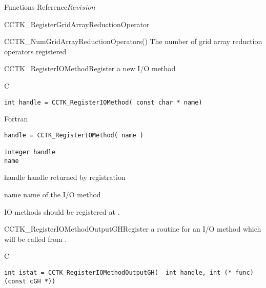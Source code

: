\begin{cactuspart}{ Functions Reference}{}{$Revision$}
\begin{FunctionDescription}{CCTK\_RegisterGridArrayReductionOperator}
\begin{SeeAlsoSection}
\begin{SeeAlso}{CCTK\_NumGridArrayReductionOperators()}
The number of grid array reduction operators registered
\end{SeeAlso}
\end{SeeAlsoSection}
\end{FunctionDescription}

\begin{FunctionDescription}{CCTK\_RegisterIOMethod}{Register a new I/O method}
\label{CCTK-RegisterIOMethod}
\begin{SynopsisSection}
\begin{Synopsis}{C}
\begin{verbatim}int handle = CCTK_RegisterIOMethod( const char * name)\end{verbatim}
\end{Synopsis}
\begin{Synopsis}{Fortran}
\begin{verbatim}handle = CCTK_RegisterIOMethod( name )

integer handle
name\end{verbatim}
\end{Synopsis}
\end{SynopsisSection}
\begin{ParameterSection}
\begin{Parameter}{handle}
handle returned by registration
\end{Parameter}
\begin{Parameter}{name}
name of the I/O method
\end{Parameter}
\end{ParameterSection}
\begin{Discussion}
IO methods should be registered at .
\end{Discussion}
\end{FunctionDescription}


\begin{FunctionDescription}{CCTK\_RegisterIOMethodOutputGH}{Register a routine for an I/O method which will be called from .}
\label{CCTK-RegisterIOMethodOutputGH}
\begin{SynopsisSection}
\begin{Synopsis}{C}
\begin{verbatim}int istat = CCTK_RegisterIOMethodOutputGH(  int handle, int (* func)(const cGH *))\end{verbatim}
\end{Synopsis}
\end{SynopsisSection}
\end{FunctionDescription}



\end{cactuspart}
